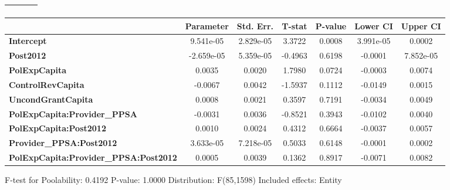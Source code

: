 \begin{center}
\begin{tabular}{lclc}
\textbf{}                                     &                    & \textbf{                     }   &                  \\
\bottomrule
\end{tabular}
\begin{tabular}{lcccccc}
                                              & \textbf{Parameter} & \textbf{Std. Err.} & \textbf{T-stat} & \textbf{P-value} & \textbf{Lower CI} & \textbf{Upper CI}  \\
\midrule
\textbf{Intercept}                            &     9.541e-05      &     2.829e-05      &      3.3722     &      0.0008      &     3.991e-05     &       0.0002       \\
\textbf{Post2012}                             &     -2.659e-05     &     5.359e-05      &     -0.4963     &      0.6198      &      -0.0001      &     7.852e-05      \\
\textbf{PolExpCapita}                         &       0.0035       &       0.0020       &      1.7980     &      0.0724      &      -0.0003      &       0.0074       \\
\textbf{ControlRevCapita}                     &      -0.0067       &       0.0042       &     -1.5937     &      0.1112      &      -0.0149      &       0.0015       \\
\textbf{UncondGrantCapita}                    &       0.0008       &       0.0021       &      0.3597     &      0.7191      &      -0.0034      &       0.0049       \\
\textbf{PolExpCapita:Provider\_PPSA}          &      -0.0031       &       0.0036       &     -0.8521     &      0.3943      &      -0.0102      &       0.0040       \\
\textbf{PolExpCapita:Post2012}                &       0.0010       &       0.0024       &      0.4312     &      0.6664      &      -0.0037      &       0.0057       \\
\textbf{Provider\_PPSA:Post2012}              &     3.633e-05      &     7.218e-05      &      0.5033     &      0.6148      &      -0.0001      &       0.0002       \\
\textbf{PolExpCapita:Provider\_PPSA:Post2012} &       0.0005       &       0.0039       &      0.1362     &      0.8917      &      -0.0071      &       0.0082       \\
\bottomrule
\end{tabular}
\end{center}

F-test for Poolability: 0.4192 \newline
 P-value: 1.0000 \newline
 Distribution: F(85,1598) \newline
  \newline
 Included effects: Entity